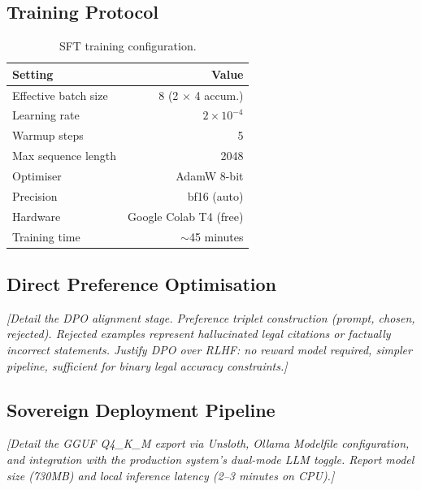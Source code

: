 \documentclass[11pt]{article}
\begin{document}
\subsection{Training Protocol}

\begin{table}[t]
\centering
\small
\begin{tabular}{lr}
\toprule
\textbf{Setting} & \textbf{Value} \\
\midrule
Effective batch size & 8 (2 $\times$ 4 accum.) \\
Learning rate & $2 \times 10^{-4}$ \\
Warmup steps & 5 \\
Max sequence length & 2048 \\
Optimiser & AdamW 8-bit \\
Precision & bf16 (auto) \\
Hardware & Google Colab T4 (free) \\
Training time & $\sim$45 minutes \\
\bottomrule
\end{tabular}
\caption{SFT training configuration.}
\label{tab:training-config}
\end{table}


\subsection{Direct Preference Optimisation}


\textit{[Detail the DPO alignment stage. Preference triplet construction
(prompt, chosen, rejected). Rejected examples represent hallucinated
legal citations or factually incorrect statements. Justify DPO over
RLHF: no reward model required, simpler pipeline, sufficient for
binary legal accuracy constraints.]}


\subsection{Sovereign Deployment Pipeline}


\textit{[Detail the GGUF Q4\_K\_M export via Unsloth, Ollama Modelfile
configuration, and integration with the production system's dual-mode
LLM toggle. Report model size (730MB) and local inference latency
(2--3 minutes on CPU).]}
\end{document}
